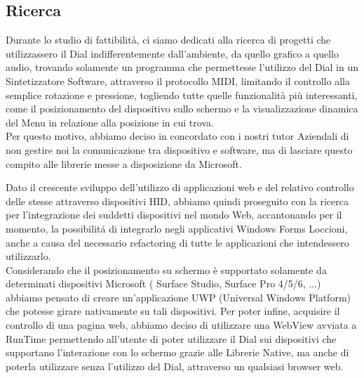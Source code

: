 \subsection{Ricerca}


Durante lo studio di fattibilità, ci siamo dedicati alla ricerca di progetti che utilizzassero il Dial \cite{son} indifferentemente dall’ambiente, da quello grafico a quello audio, trovando solamente un programma che permettesse l'utilizzo del Dial in un Sintetizzatore Software, attraverso il protocollo MIDI, limitando il controllo alla semplice rotazione e pressione, togliendo tutte quelle funzionalità più interessanti, come il posizionamento del dispositivo sullo schermo e la visualizzazione dinamica del Menu in relazione alla posizione in cui trova.\\

Per questo motivo, abbiamo deciso in concordato con i nostri tutor Aziendali di non gestire noi la comunicazione tra dispositivo e software, ma di lasciare questo compito alle librerie messe a disposizione da Microsoft.

Dato il crescente sviluppo dell'utilizzo di applicazioni web e del relativo controllo delle stesse attraverso dispositivi HID, abbiamo quindi proseguito con la ricerca per l'integrazione dei suddetti dispositivi nel mondo Web, accantonando per il momento, la possibilitá di integrarlo negli applicativi Windows Forms Loccioni, anche a causa del necessario refactoring di tutte le applicazioni che intendessero utilizzarlo.\\

Considerando che il posizionamento su schermo è supportato solamente da determinati dispositivi Microsoft ( Surface Studio, Surface Pro 4/5/6, ...) abbiamo pensato di creare un’applicazione UWP (Universal Windows Platform) che potesse girare nativamente su tali dispositivi. Per poter infine, acquisire il controllo di una pagina web, abbiamo deciso di utilizzare una WebView avviata a RunTime permettendo all'utente di poter utilizzare il Dial sui dispositivi che supportano l'interazione con lo schermo grazie alle Librerie Native, ma anche di poterla utilizzare senza l'utilizzo del Dial, attraverso un qualsiasi browser web.

\newpage
